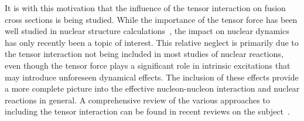 It is with this motivation that the influence of the tensor interaction on fusion cross sections is being studied.
While the importance of the tensor force has been well studied in nuclear structure calculations~\citep{otsuka2005,otsuka2006,lesinski2007,colo2007,bai2010,otsuka2010,brink2018}, the impact on nuclear dynamics has only recently been a topic of interest.
This relative neglect is primarily due to the tensor interaction not being included in most studies of nuclear reactions, even though the tensor force plays a significant role in intrinsic excitations that may introduce unforeseen dynamical effects.
The inclusion of these effects provide a more complete picture into the effective nucleon-nucleon interaction and nuclear reactions in general.
A comprehensive review of the various approaches to including the tensor interaction can be found in recent reviews on the subject~\citep{sagawa2014,stevenson2019}.

